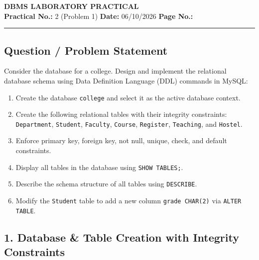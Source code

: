 \label{exp:ddl}
\label{exp:ddl_prob1}
\noindent
\begin{center}
    {\LARGE \textbf{DBMS LABORATORY PRACTICAL}}\\[0.25cm]
    \textbf{Practical No.:} 2 (Problem 1) \hfill \textbf{Date:} 06/10/2026 \hfill \textbf{Page No.:} \thepage
\end{center}
\vspace{-0.2cm}
\hrule
\vspace{0.35cm}

\subsection*{Question / Problem Statement}
Consider the database for a college. Design and implement the relational database schema using Data Definition Language (DDL) commands in MySQL:
\begin{enumerate}[noitemsep,topsep=2pt]
    \item[(i)] Create the database \texttt{college} and select it as the active database context.
    \item[(ii)] Create the following relational tables with their integrity constraints: \texttt{Department}, \texttt{Student}, \texttt{Faculty}, \texttt{Course}, \texttt{Register}, \texttt{Teaching}, and \texttt{Hostel}.
    \item[(iii)] Enforce primary key, foreign key, not null, unique, check, and default constraints.
    \item[(iv)] Display all tables in the database using \texttt{SHOW TABLES;}.
    \item[(v)] Describe the schema structure of all tables using \texttt{DESCRIBE}.
    \item[(vi)] Modify the \texttt{Student} table to add a new column \texttt{grade CHAR(2)} via \texttt{ALTER TABLE}.
\end{enumerate}

\subsection*{1. Database \& Table Creation with Integrity Constraints}

